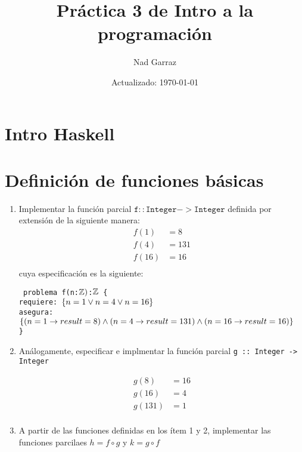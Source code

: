 \documentclass[12pt,a4paper,spanish]{article}
\begin{document}
\pagestyle{empty} %

\title{Práctica 3 de Intro a la programación}
\author{Nad Garraz}
\date{Actualizado: \today} %
\maketitle
\thispagestyle{empty}


\section{Intro Haskell}


\separador
\section{ Definición de funciones básicas}
\ejercicio
\begin{enumerate}[label=\alph*)]
	\item Implementar la función parcial $\mathtt{f :: Integer -> Integer}$ definida por extensión de la siguiente manera:
	      \begin{align*}
		      f(1)  & = 8   \\
		      f(4)  & = 131 \\
		      f(16) & = 16  \\
	      \end{align*}
	      cuya especificación es la siguiente:

	      {\tt
	      problema f(n:$\mathbb Z)$:$\mathbb Z$ \{\\
	      \indent \quad requiere: $\{n = 1 \lor n = 4 \lor n = 16 \}$ \\
	      \indent \quad asegura: $\{(n = 1  \to result = 8)  \land (n = 4 \to result = 131) \land (n = 16 \to result = 16)\}$\\
	      \}
	      }\\
	      \separadorCorto

	      \separador

	\item
	      Análogamente, especificar e implmentar la función parcial \texttt{g :: Integer -> Integer}

	      \begin{align*}
		      g(8)   & = 16 \\
		      g(16)  & = 4  \\
		      g(131) & = 1  \\
	      \end{align*}
	      \separadorCorto

	      \separador

	\item
	      A partir de las funciones definidas en los ítem 1 y 2, implementar las funciones parcilaes $h = f \circ g$ y $k = g \circ f$

\end{enumerate}
\end{document}
